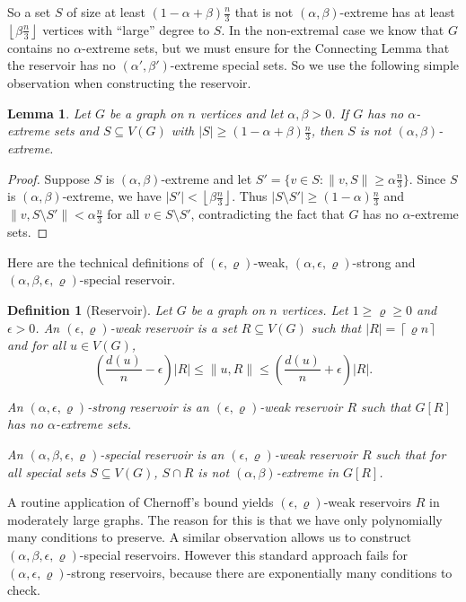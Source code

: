 \documentclass[oneside,12pt]{memoir}
\newtheorem{lemma}[theorem]{Lemma}
\newtheorem{definition}[theorem]{Definition}
\newcommand{\ep}{\epsilon}
\newcommand{\floor}[1]{\left\lfloor#1\right\rfloor}
\newcommand{\ceiling}[1]{\left\lceil#1\right\rceil}
\begin{document}
So a set $S$ of size at least $(1-\alpha+\beta)\frac{n}{3}$ that is not $(\alpha,\beta)$-extreme has at least $\floor{\beta\frac{n}{3}}$ vertices with ``large'' degree to $S$.  In the non-extremal case we know that $G$ contains no $\alpha$-extreme sets, but we must ensure for the Connecting Lemma that the reservoir has no $(\alpha', \beta')$-extreme special sets.  So we use the following simple observation when constructing the reservoir.

\begin{lemma}
\label{nicevertices} Let $G$ be a graph on $n$ vertices and let $\alpha,\beta>0$. If $G$ has no $\alpha$-extreme sets and $S\subseteq V(G)$ with $|S|\geq (1-\alpha+\beta)\frac{n}{3}$, then $S$ is not $(\alpha, \beta)$-extreme. 
\end{lemma}
\begin{proof}
Suppose $S$ is $(\alpha, \beta)$-extreme and let $S'=\{v\in S: \|v, S\|\geq \alpha\frac{n}{3}\}$. Since $S$ is $(\alpha, \beta)$-extreme, we have $|S'|<\floor{\beta\frac{n}{3}}$.  Thus $|S\setminus S'|\geq (1-\alpha)\frac{n}{3}$ and $\|v, S\setminus S'\|<\alpha\frac{n}{3}$ for all $v\in S\setminus S'$, contradicting the fact that $G$ has no $\alpha$-extreme sets.
\end{proof}


Here are the technical definitions of $(\ep, \varrho)$-weak,
$(\alpha, \ep, \varrho)$-strong and $(\alpha, \beta, \ep, \varrho)$-special
reservoir. 
\begin{definition}
[Reservoir] \label{def:Reservoir}Let $G$ be a graph on $n$ vertices. Let $1\geq \varrho\geq 0$ and
$\ep>0$. An \emph{$(\ep, \varrho)$-weak reservoir} is a set $R\subseteq V(G)$
such that $|R|=\ceiling{\varrho n}$ and for all $u\in V(G)$, \[
\left(\frac{d(u)}{n}-\ep\right)|R|\le\|u,R\|\leq\left(\frac{d(u)}{n}+\ep\right)|R|.\]

An \emph{$(\alpha, \ep, \varrho)$-strong reservoir} is an $(\ep,\varrho)$-weak
reservoir $R$ such that $G[R]$ has no $\alpha$-extreme sets.

An \emph{$(\alpha, \beta, \ep,\varrho)$-special reservoir} is an $(\ep, \varrho)$-weak
reservoir $R$ such that for all special sets $S\subseteq V(G)$, $S\cap R$ is not $(\alpha, \beta)$-extreme in $G[R]$.
\end{definition}
A routine application of Chernoff's bound yields $(\ep,\varrho)$-weak
reservoirs $R$ in moderately large graphs. The reason for this is
that we have only polynomially many conditions to preserve. A similar
observation allows us to construct $(\alpha, \beta, \ep,\varrho)$-special
reservoirs. However this standard approach fails for $(\alpha,\ep,\varrho)$-strong
reservoirs, because there are exponentially many conditions to check.
\end{document}
